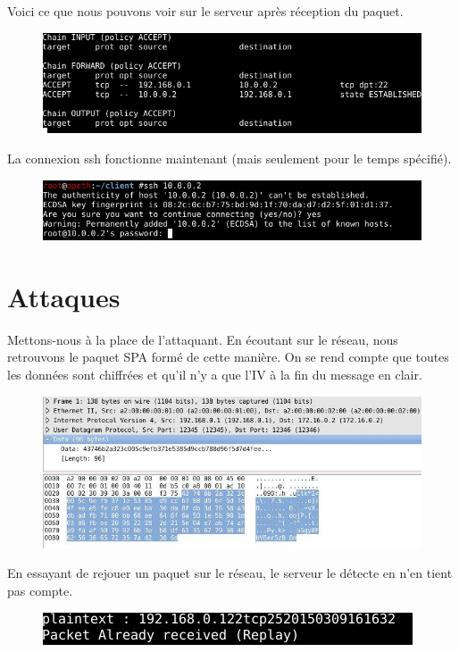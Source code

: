 Voici ce que nous pouvons voir sur le serveur après réception du paquet.
\clearpage

\begin{figure}[h]

\centerline{\includegraphics[scale=0.7]{regles_apres.jpeg}}

\end{figure}

La connexion ssh fonctionne maintenant (mais seulement pour le temps spécifié).

\begin{figure}[h]

\centerline{\includegraphics[scale=0.6]{test_ssh2.jpeg}}

\end{figure}

\clearpage
\section{Attaques}

Mettons-nous à la place de l'attaquant. En écoutant sur le réseau, nous retrouvons le paquet SPA formé de cette manière. On se rend compte que toutes les données sont chiffrées et qu'il n'y a que l'IV à la fin du message en clair.

\begin{figure}[h]

\centerline{\includegraphics[scale=0.6]{wireshark.jpeg}}

\end{figure}

En essayant de rejouer un paquet sur le réseau, le serveur le détecte en n'en tient pas compte.

\begin{figure}[h]

\centerline{\includegraphics[scale=0.8]{rejeu.jpeg}}

\end{figure}

